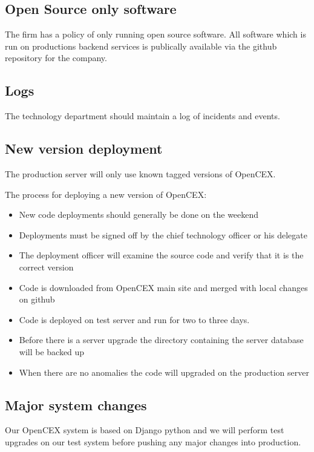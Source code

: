 \subsection{Open Source only software}

The firm has a policy of only running open source software.  All
software which is run on productions backend services is publically
available via the github repository for the company.

\subsection{Logs}
The technology department should maintain a log of incidents and
events.

\subsection{New version deployment}
The production server will only use known tagged versions of OpenCEX.

The process for deploying a new version of OpenCEX:
\begin{itemize}
  \item New code deployments should generally be done on the weekend
  \item Deployments must be signed off by the chief technology officer
    or his delegate
  \item The deployment officer will examine the source code and verify
    that it is the correct version
  \item Code is downloaded from OpenCEX main site and merged with
    local changes on github
  \item Code is deployed on test server and run for two to three days.
  \item Before there is a server upgrade the directory containing the
    server database will be backed up
  \item When there are no anomalies the code will upgraded on the
    production server
\end{itemize}

\subsection{Major system changes}

Our OpenCEX system is based on Django python and we will perform test
upgrades on our test system before pushing any major changes into
production.

